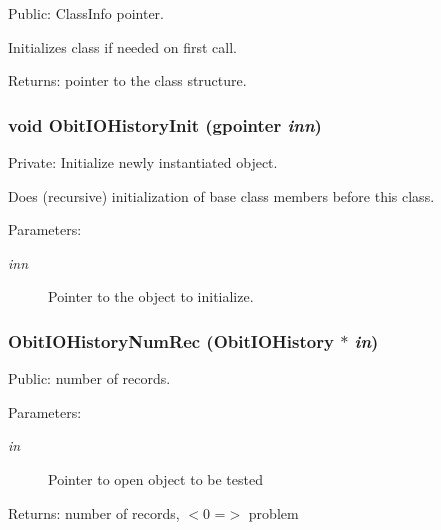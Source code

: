 Public: Class\-Info pointer. 

Initializes class if needed on first call. \begin{Desc}
\item[Returns:]pointer to the class structure. \end{Desc}
\subsubsection{\setlength{\rightskip}{0pt plus 5cm}void Obit\-IOHistory\-Init (gpointer {\em inn})}\label{ObitIOHistory_8c_a3}


Private: Initialize newly instantiated object. 

Does (recursive) initialization of base class members before this class. \begin{Desc}
\item[Parameters:]
\begin{description}
\item[{\em inn}]Pointer to the object to initialize. \end{description}
\end{Desc}
\subsubsection{ Obit\-IOHistory\-Num\-Rec ({\bf Obit\-IOHistory} $\ast$ {\em in})}\label{ObitIOHistory_8c_a16}


Public: number of records. 

\begin{Desc}
\item[Parameters:]
\begin{description}
\item[{\em in}]Pointer to open object to be tested \end{description}
\end{Desc}
\begin{Desc}
\item[Returns:]number of records, $<$0 =$>$ problem \end{Desc}
